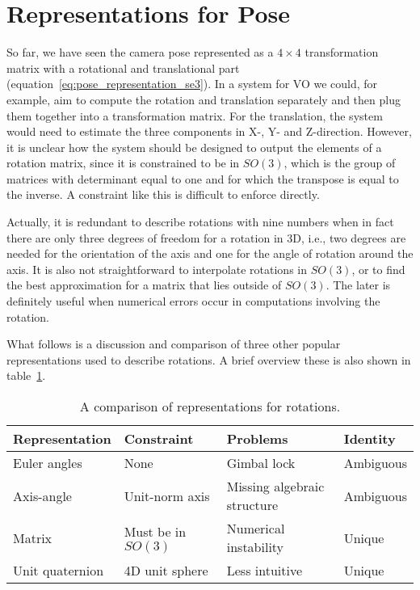 	\section{Representations for Pose}
		
		So far, we have seen the camera pose represented as a $4 \times 4$ transformation matrix with a rotational and translational part (equation~\ref{eq:pose_representation_se3}).
		In a system for VO we could, for example, aim to compute the rotation and translation separately and then plug them together into a transformation matrix.
		For the translation, the system would need to estimate the three components in X-, Y- and Z-direction.
		However, it is unclear how the system should be designed to output the elements of a rotation matrix, since it is constrained to be in 
		$SO(3)$, which is the group of matrices with determinant equal to one and for which the transpose is equal to the inverse.
		A constraint like this is difficult to enforce directly.
		
		Actually, it is redundant to describe rotations with nine numbers when in fact there are only three degrees of freedom for a rotation in 3D, i.e., two degrees are needed for the orientation of the axis and one for the angle of rotation around the axis.
		It is also not straightforward to interpolate rotations in $SO(3)$, or to find the best approximation for a matrix that lies outside of $SO(3)$.
		The later is definitely useful when numerical errors occur in computations involving the rotation.
		
		What follows is a discussion and comparison of three other popular representations used to describe rotations.
		A brief overview these is also shown in table~\ref{tbl:comparison_representations_of_rotations}.
		\begin{table}
			\small
			\begin{center}
				\begin{tabular}{llll}
					\toprule
					Representation	& Constraint 			& Problems 				& Identity			\\
					\midrule
					Euler angles 	& None 					& Gimbal lock 			& Ambiguous 		\\
					Axis-angle 		& Unit-norm axis 		& Missing algebraic structure						& Ambiguous 		\\
					Matrix 			& Must be in $SO(3)$ 	& Numerical instability	& Unique 			\\
					Unit quaternion & 4D unit sphere 		& Less intuitive 		& Unique			\\
					\bottomrule
				\end{tabular}
			\end{center}
			\caption[A comparison of representations for rotations]
					{A comparison of representations for rotations.
					 \label{tbl:comparison_representations_of_rotations}}
		\end{table}
	
